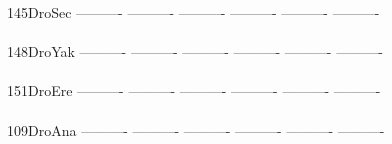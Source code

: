 \documentclass[11pt,twoside,reqno,a4paper]{article}
\begin{document}
{145\hspace*{2\charwidth}DroSec	----------	----------	----------	----------	----------	----------	\\
\hspace*{5\charwidth}\hspace*{7\charwidth}\hspace*{1\charwidth}\hspace*{1\charwidth}\hspace*{1\charwidth}\hspace*{1\charwidth}\hspace*{1\charwidth}\hspace*{1\charwidth}\\
148\hspace*{2\charwidth}DroYak	----------	----------	----------	----------	----------	----------	\\
\hspace*{5\charwidth}\hspace*{7\charwidth}\hspace*{1\charwidth}\hspace*{1\charwidth}\hspace*{1\charwidth}\hspace*{1\charwidth}\hspace*{1\charwidth}\hspace*{1\charwidth}\\
151\hspace*{2\charwidth}DroEre	----------	----------	----------	----------	----------	----------	\\
\hspace*{5\charwidth}\hspace*{7\charwidth}\hspace*{1\charwidth}\hspace*{1\charwidth}\hspace*{1\charwidth}\hspace*{1\charwidth}\hspace*{1\charwidth}\hspace*{1\charwidth}\\
109\hspace*{2\charwidth}DroAna	----------	----------	----------	----------	----------	----------	\\
\hspace*{5\charwidth}\hspace*{7\charwidth}\hspace*{1\charwidth}\hspace*{1\charwidth}\hspace*{1\charwidth}\hspace*{1\charwidth}\hspace*{1\charwidth}\hspace*{1\charwidth}\\
}
\end{document}
